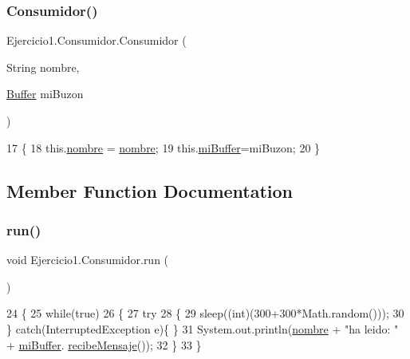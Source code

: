 \subsubsection{\texorpdfstring{Consumidor()}{Consumidor()}}
{\footnotesize\ttfamily Ejercicio1.\+Consumidor.\+Consumidor (\begin{DoxyParamCaption}\item[{String}]{nombre,  }\item[{\mbox{\hyperlink{class_ejercicio1_1_1_buffer}{Buffer}}}]{mi\+Buzon }\end{DoxyParamCaption})\hspace{0.3cm}{\ttfamily [inline]}}


\begin{DoxyCode}
17     \{
18         this.\mbox{\hyperlink{class_ejercicio1_1_1_consumidor_ab75c008fd9c0c5a5e0ce3e09101ba3e4}{nombre}} = \mbox{\hyperlink{class_ejercicio1_1_1_consumidor_ab75c008fd9c0c5a5e0ce3e09101ba3e4}{nombre}};
19         this.\mbox{\hyperlink{class_ejercicio1_1_1_consumidor_a1175b191e4381ba7b58a8049158791b5}{miBuffer}}=miBuzon;
20     \}
\end{DoxyCode}


\subsection{Member Function Documentation}
\mbox{\label{class_ejercicio1_1_1_consumidor_abce2b0923447de7c4fe720301d8da71b}} 
\subsubsection{\texorpdfstring{run()}{run()}}
{\footnotesize\ttfamily void Ejercicio1.\+Consumidor.\+run (\begin{DoxyParamCaption}{ }\end{DoxyParamCaption})\hspace{0.3cm}{\ttfamily [inline]}}


\begin{DoxyCode}
24     \{
25         \textcolor{keywordflow}{while}(\textcolor{keyword}{true})
26         \{
27             \textcolor{keywordflow}{try}
28             \{
29                 sleep((\textcolor{keywordtype}{int})(300+300*Math.random()));
30             \} \textcolor{keywordflow}{catch}(InterruptedException e)\{ \}
31             System.out.println(\mbox{\hyperlink{class_ejercicio1_1_1_consumidor_ab75c008fd9c0c5a5e0ce3e09101ba3e4}{nombre}} + \textcolor{stringliteral}{"ha leido: "} + \mbox{\hyperlink{class_ejercicio1_1_1_consumidor_a1175b191e4381ba7b58a8049158791b5}{miBuffer}}.
      \mbox{\hyperlink{class_ejercicio1_1_1_buffer_a534af142b15755b1e0d4c6511e37683b}{recibeMensaje}}());
32         \}
33     \}
\end{DoxyCode}


